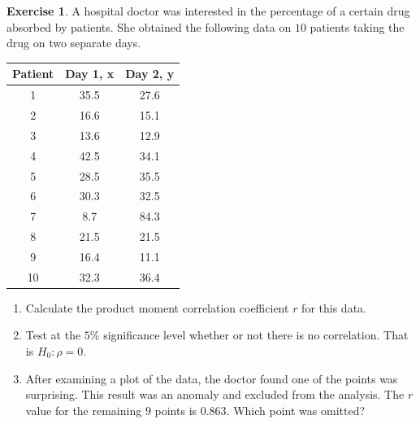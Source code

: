 \documentclass[
]{book}
\theoremstyle{definition}
\theoremstyle{definition}
\theoremstyle{definition}
\newtheorem{exercise}{Exercise}[chapter]
\theoremstyle{definition}
\theoremstyle{remark}
\begin{document}
\begin{exercise}

A hospital doctor was interested in the percentage of a certain drug absorbed by patients. She obtained the following data on \(10\) patients taking the drug on two separate days.

\begin{longtable}[]{@{}ccc@{}}
\toprule
Patient & Day 1, x & Day 2, y\tabularnewline
\midrule
\endhead
1 & 35.5 & 27.6\tabularnewline
2 & 16.6 & 15.1\tabularnewline
3 & 13.6 & 12.9\tabularnewline
4 & 42.5 & 34.1\tabularnewline
5 & 28.5 & 35.5\tabularnewline
6 & 30.3 & 32.5\tabularnewline
7 & 8.7 & 84.3\tabularnewline
8 & 21.5 & 21.5\tabularnewline
9 & 16.4 & 11.1\tabularnewline
10 & 32.3 & 36.4\tabularnewline
\bottomrule
\end{longtable}

\begin{enumerate}
\def\labelenumi{\alph{enumi})}
\item
  Calculate the product moment correlation coefficient \(r\) for this data.
\item
  Test at the \(5\%\) significance level whether or not there is no correlation. That is \(H_0:\rho = 0\).
\item
  After examining a plot of the data, the doctor found one of the points was surprising. This result was an anomaly and excluded from the analysis. The \(r\) value for the remaining \(9\) points is \(0.863\). Which point was omitted?
\end{enumerate}

\end{exercise}

  
\end{document}
